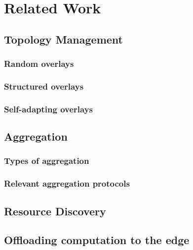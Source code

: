 \chapter{Related Work}
\label{cha:related_work}

\section{Topology Management} %
\label{sec:topology_mgmt}

\subsection{Random overlays}
\subsection{Structured overlays}
\subsection{Self-adapting overlays}

\section{Aggregation} %
\label{sec:aggregation}

\subsection{Types of aggregation}
\subsection{Relevant aggregation protocols}

\section{Resource Discovery} %
\label{sec:res_discvovery}

\section{Offloading computation to the edge} %
\label{sec:offloading_comp}